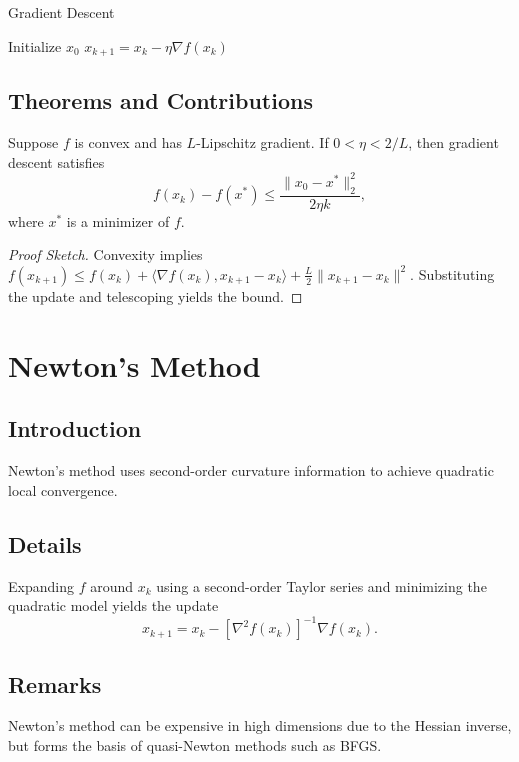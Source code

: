 \begin{algorithm}
\caption{Gradient Descent}
\begin{algorithmic}[1]
\STATE Initialize $x_0$
    \STATE $x_{k+1}=x_k-\eta\nabla f(x_k)$
\ENDFOR
\end{algorithmic}
\end{algorithm}

\subsection{Theorems and Contributions}
\begin{theorem}
Suppose $f$ is convex and has $L$-Lipschitz gradient. If $0<\eta<2/L$, then gradient descent satisfies
\begin{equation}
f(x_k)-f(x^*)\le\frac{\|x_0-x^*\|_2^2}{2\eta k},
\end{equation}
where $x^*$ is a minimizer of $f$.
\end{theorem}
\begin{proof}[Proof Sketch]
Convexity implies $f(x_{k+1})\le f(x_k)+\langle\nabla f(x_k),x_{k+1}-x_k\rangle+\tfrac{L}{2}\|x_{k+1}-x_k\|^2$. Substituting the update and telescoping yields the bound.
\end{proof}

\section{Newton's Method}
\subsection{Introduction}
Newton's method uses second-order curvature information to achieve quadratic local convergence.
\subsection{Details}
Expanding $f$ around $x_k$ using a second-order Taylor series and minimizing the quadratic model yields the update
\begin{equation}
x_{k+1}=x_k-\left[\nabla^2 f(x_k)\right]^{-1}\nabla f(x_k).
\end{equation}
\subsection{Remarks}
Newton's method can be expensive in high dimensions due to the Hessian inverse, but forms the basis of quasi-Newton methods such as BFGS.

